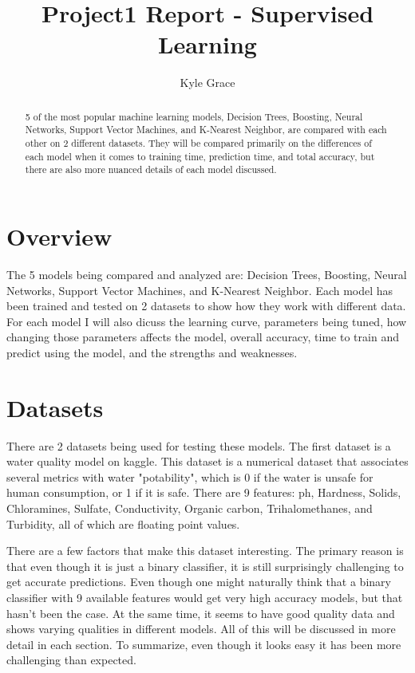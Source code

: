 \documentclass[
	letterpaper, %
]{mlreport}
\author{Kyle Grace}
\title{Project1 Report - Supervised Learning}
\begin{document}

\maketitle

\begin{abstract}
5 of the most popular machine learning models, Decision Trees, Boosting, Neural Networks, Support Vector Machines, and K-Nearest Neighbor, are compared with each other on 2 different datasets. They will be compared primarily on the differences of each model when it comes to training time, prediction time, and total accuracy, but there are also more nuanced details of each model discussed.
\end{abstract}

\section{Overview}
The 5 models being compared and analyzed are: Decision Trees, Boosting, Neural Networks, Support Vector Machines, and K-Nearest Neighbor. Each model has been trained and tested on 2 datasets to show how they work with different data. For each model I will also dicuss the learning curve, parameters being tuned, how changing those parameters affects the model, overall accuracy, time to train and predict using the model, and the strengths and weaknesses.

\section{Datasets}
There are 2 datasets being used for testing these models. The first dataset is a water quality model on kaggle. This dataset is a numerical dataset that associates several metrics with water "potability", which is 0 if the water is unsafe for human consumption, or 1 if it is safe. There are 9 features: ph, Hardness, Solids, Chloramines, Sulfate, Conductivity, Organic carbon, Trihalomethanes, and Turbidity, all of which are floating point values.

There are a few factors that make this dataset interesting. The primary reason is that even though it is just a binary classifier, it is still surprisingly challenging to get accurate predictions. Even though one might naturally think that a binary classifier with 9 available features would get very high accuracy models, but that hasn't been the case. At the same time, it seems to have good quality data and shows varying qualities in different models. All of this will be discussed in more detail in each section. To summarize, even though it looks easy it has been more challenging than expected.
\end{document}
